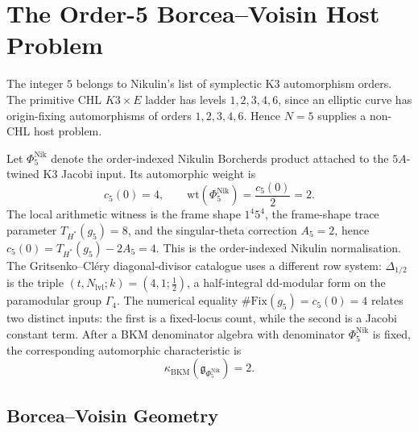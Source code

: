 \providecommand{\ZZ}{\mathbb{Z}}
\providecommand{\QQ}{\mathbb{Q}}
\providecommand{\CC}{\mathbb{C}}
\providecommand{\HH}{\mathbb{H}}
\providecommand{\kBKM}{\kappa_{\mathrm{BKM}}}
\providecommand{\kch}{\kappa_{\mathrm{ch}}}
\providecommand{\kcat}{\kappa_{\mathrm{cat}}}
\providecommand{\kfib}{\kappa_{\mathrm{fiber}}}
\providecommand{\Aut}{\mathrm{Aut}}
\providecommand{\Auts}{\mathrm{Aut}_{s}}
\providecommand{\Fix}{\mathrm{Fix}}
\providecommand{\Sp}{\mathrm{Sp}}
\providecommand{\wt}{\mathrm{wt}}
\providecommand{\BV}{\mathrm{BV}}
\providecommand{\BPS}{\mathrm{BPS}}
\providecommand{\DT}{\mathrm{DT}}
\providecommand{\red}{\mathrm{red}}
\providecommand{\PhiNik}{\Phi_{5}^{\mathrm{Nik}}}
\providecommand{\Dhalf}{\Delta_{1/2}}
\providecommand{\Dmonic}{D_5}
\providecommand{\DeltaFive}{\Delta_5}

\section*{The Order-5 Borcea--Voisin Host Problem}
\label{sec:n5-borcea-voisin-candidate}

The integer \(5\) belongs to Nikulin's list of symplectic K3
automorphism orders.  The primitive CHL \(K3\times E\) ladder has
levels \(1,2,3,4,6\), since an elliptic curve has origin-fixing
automorphisms of orders \(1,2,3,4,6\).  Hence \(N=5\) supplies a
non-CHL host problem.

Let \(\PhiNik\) denote the order-indexed Nikulin Borcherds product
attached to the \(5A\)-twined K3 Jacobi input.  Its automorphic weight is
\[
  c_5(0)=4,\qquad
  \wt(\PhiNik)=\frac{c_5(0)}{2}=2 .
\]
The local arithmetic witness is the frame shape \(1^4 5^4\), the
frame-shape trace parameter \(T_{H^*}(g_5)=8\), and the
singular-theta correction \(A_5=2\), hence
\(c_5(0)=T_{H^*}(g_5)-2A_5=4\).  This is the
order-indexed Nikulin normalisation.  The Gritsenko--Cl\'ery
diagonal-divisor catalogue uses a different row system: \(\Dhalf\) is
the triple
\((t,N_{\mathrm{lvl}};k)=(4,1;\tfrac12)\), a half-integral dd-modular
form on the paramodular group \(\Gamma_4\).  The numerical equality
\(\#\Fix(g_5)=c_5(0)=4\) relates two distinct inputs: the first is a
fixed-locus count, while the second is a Jacobi constant term.  After a
BKM denominator algebra with denominator \(\PhiNik\) is fixed, the
corresponding automorphic characteristic is
\[
  \kBKM(\mathfrak g_{\PhiNik})=2 .
\]

\subsection*{Borcea--Voisin Geometry}

